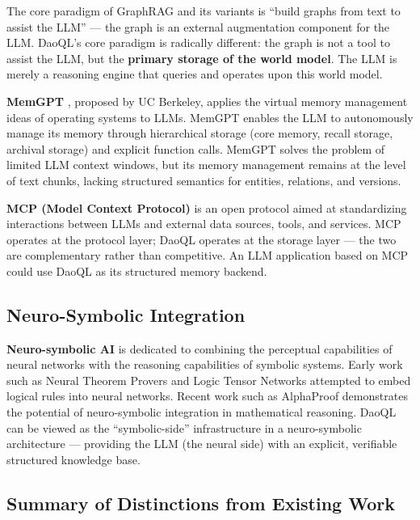 \documentclass[11pt,a4paper]{article}
\begin{document}
The core paradigm of GraphRAG and its variants is ``build graphs from
text to assist the LLM'' --- the graph is an external augmentation
component for the LLM. DaoQL's core paradigm is radically different: the
graph is not a tool to assist the LLM, but the \textbf{primary storage
of the world model}. The LLM is merely a reasoning engine that queries
and operates upon this world model.

\textbf{MemGPT} \cite{packer2023}, proposed by UC Berkeley, applies the virtual
memory management ideas of operating systems to LLMs. MemGPT enables the
LLM to autonomously manage its memory through hierarchical storage (core
memory, recall storage, archival storage) and explicit function calls.
MemGPT solves the problem of limited LLM context windows, but its memory
management remains at the level of text chunks, lacking structured
semantics for entities, relations, and versions.

\textbf{MCP (Model Context Protocol)} \cite{anthropic2025} is an open protocol aimed
at standardizing interactions between LLMs and external data sources,
tools, and services. MCP operates at the protocol layer; DaoQL operates
at the storage layer --- the two are complementary rather than
competitive. An LLM application based on MCP could use DaoQL as its
structured memory backend.

\subsection{Neuro-Symbolic
Integration}\label{neuro-symbolic-integration}

\textbf{Neuro-symbolic AI} \cite{garcez2023} is dedicated to combining the
perceptual capabilities of neural networks with the reasoning
capabilities of symbolic systems. Early work such as Neural Theorem
Provers \cite{rocktaschel2017} and Logic Tensor Networks \cite{serafini2016} attempted to embed
logical rules into neural networks. Recent work such as AlphaProof
\cite{alphaproof2024} demonstrates the potential of neuro-symbolic integration in
mathematical reasoning. DaoQL can be viewed as the ``symbolic-side''
infrastructure in a neuro-symbolic architecture --- providing the LLM
(the neural side) with an explicit, verifiable structured knowledge
base.

\subsection{Summary of Distinctions from Existing
Work}\label{summary-of-distinctions-from-existing-work}
\end{document}
